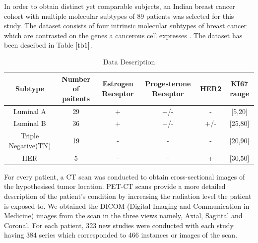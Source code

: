 \documentclass[final,1p,times,twocolumn]{elsarticle}
\begin{document}
In order to obtain distinct yet comparable subjects, an Indian breast cancer cohort with multiple molecular subtypes of 89 patients was selected for this study. The dataset consists    of four intrinsic molecular subtypes of breast cancer which are contrasted on the genes a cancerous cell expresses \cite{b} \cite{c}. The dataset has been descibed in Table $\ref{tb1}$.

\begin{table}[!b]
\scriptsize
\centering
\caption{Data Description}
\label{tb1}
\begin{tabular}{| c | c | c | c | c | c |}
\hline
\textbf{Subtype} & \textbf{Number of paitents} & \textbf{Estrogen Receptor} & \textbf{Progesterone Receptor} & \textbf{HER2} & \textbf{KI67 range}\\
\hline
Luminal A & 29 & + & +/- & - & [5,20] \\
Luminal B & 36 & + & +/- & +/- & [25,80] \\
Triple Negative(TN) & 19 & - & - & - & [20,90] \\
HER & 5 & - & - & + & [30,50]\\
\hline
\end{tabular}
\end{table}

For every patient, a CT scan was conducted to obtain cross-sectional images of the hypothesised tumor location. PET-CT scans provide a more detailed description of the patient's condition by increasing the radiation level the patient is exposed to. We obtained the DICOM (Digital Imaging and Communication in Medicine) images from the scan in  the three views namely, Axial, Sagittal and Coronal. For each patient, 323 new studies were conducted with each study having 384 series which corresponded to 466 instances or images of the scan. 

\end{document}
